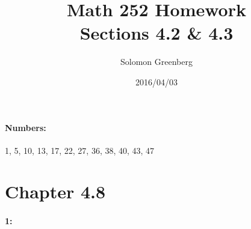 \documentclass[12pt]{article}
\title{Math 252 Homework\\
\large Sections 4.2 \& 4.3}
\date{2016/04/03}
\author{Solomon Greenberg}
\begin{document}
    \newpage
    \paragraph*{Numbers:} 1, 5, 10, 13, 17, 22, 27, 36, 38, 40, 43, 47


    \section*{Chapter 4.8}
    \paragraph*{1:\\} 




\thispagestyle{fancy}
\end{document}
